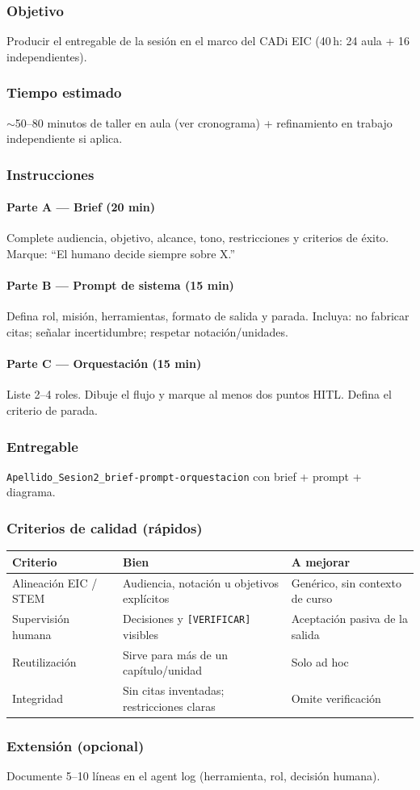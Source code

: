 \subsubsection*{Objetivo}
Producir el entregable de la sesión en el marco del CADi EIC (40\,h: 24 aula + 16 independientes).

\subsubsection*{Tiempo estimado}
$\sim$50--80 minutos de taller en aula (ver cronograma) + refinamiento en trabajo independiente si aplica.

\subsubsection*{Instrucciones}
\paragraph{Parte A --- Brief (20 min)} Complete audiencia, objetivo, alcance, tono, restricciones y criterios de éxito. Marque: ``El humano decide siempre sobre X.''
\paragraph{Parte B --- Prompt de sistema (15 min)} Defina rol, misión, herramientas, formato de salida y parada. Incluya: no fabricar citas; señalar incertidumbre; respetar notación/unidades.
\paragraph{Parte C --- Orquestación (15 min)} Liste 2--4 roles. Dibuje el flujo y marque al menos dos puntos HITL. Defina el criterio de parada.

\subsubsection*{Entregable}
\texttt{Apellido\_Sesion2\_brief-prompt-orquestacion} con brief + prompt + diagrama.

\subsubsection*{Criterios de calidad (rápidos)}
\begin{tabularx}{\textwidth}{@{}lXX@{}}
\toprule
Criterio & Bien & A mejorar \\
\midrule
Alineación EIC / STEM & Audiencia, notación u objetivos explícitos & Genérico, sin contexto de curso \\
Supervisión humana & Decisiones y \texttt{[VERIFICAR]} visibles & Aceptación pasiva de la salida \\
Reutilización & Sirve para más de un capítulo/unidad & Solo ad hoc \\
Integridad & Sin citas inventadas; restricciones claras & Omite verificación \\
\bottomrule
\end{tabularx}

\subsubsection*{Extensión (opcional)}
Documente 5--10 líneas en el agent log (herramienta, rol, decisión humana).

